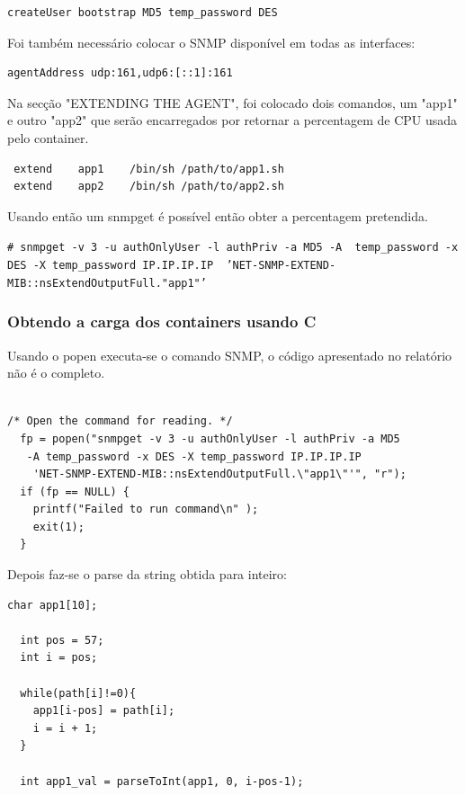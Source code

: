 \documentclass[pdftex,12pt,a4paper]{report}
\newcommand{\shellcmd}[1]{\indent\indent\texttt{\footnotesize\# #1}\\}
\begin{document}
\begin{lstlisting}
createUser bootstrap MD5 temp_password DES
\end{lstlisting}

Foi também necessário colocar o SNMP disponível em todas as interfaces:

\begin{lstlisting}
agentAddress udp:161,udp6:[::1]:161
\end{lstlisting}

Na secção "EXTENDING THE AGENT", foi colocado dois comandos, um "app1" e outro "app2" que serão encarregados por retornar a percentagem de CPU usada pelo container.

\begin{lstlisting}
 extend    app1    /bin/sh /path/to/app1.sh
 extend    app2    /bin/sh /path/to/app2.sh 
\end{lstlisting}

Usando então um snmpget é possível então obter a percentagem pretendida.

\shellcmd{snmpget -v 3 -u authOnlyUser -l authPriv -a MD5 -A \
temp\_password -x DES -X temp\_password IP.IP.IP.IP \
 'NET-SNMP-EXTEND-MIB::nsExtendOutputFull."app1"'}

\subsubsection{Obtendo a carga dos containers usando C}

Usando o popen executa-se o comando SNMP, o código apresentado no relatório não é o completo.

\begin{lstlisting}

/* Open the command for reading. */
  fp = popen("snmpget -v 3 -u authOnlyUser -l authPriv -a MD5
   -A temp_password -x DES -X temp_password IP.IP.IP.IP
    'NET-SNMP-EXTEND-MIB::nsExtendOutputFull.\"app1\"'", "r");
  if (fp == NULL) {
    printf("Failed to run command\n" );
    exit(1);
  }

\end{lstlisting}

Depois faz-se o parse da string obtida para inteiro:

\begin{lstlisting}
char app1[10];

  int pos = 57;
  int i = pos;

  while(path[i]!=0){
    app1[i-pos] = path[i];
    i = i + 1;
  }

  int app1_val = parseToInt(app1, 0, i-pos-1);
\end{lstlisting}
\end{document}
